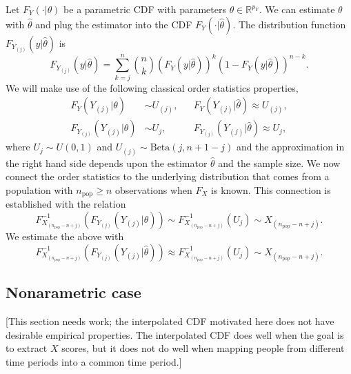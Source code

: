 \documentclass[11pt]{article}
\newcommand{\R}{\mathbb{R}}
\newcommand{\npop}{n_{\text{pop}}}
\newcommand{\nsys}{n}
\begin{document}
Let $F_Y(\cdot|\theta)$ be a parametric CDF with parameters $\theta \in \R^{p_Y}$. We can estimate $\theta$ with $\hat{\theta}$ and plug the estimator into the CDF $F_Y(\cdot|\hat{\theta})$. The distribution function $F_{Y_{(j)}}(y|\hat{\theta})$ is
$$
  F_{Y_{(j)}}(y|\hat{\theta}) = \sum_{k=j}^{\nsys}
    {\nsys \choose k}\left(F_Y(y|\hat{\theta})\right)^k
      \left(1 - F_Y(y|\hat{\theta})\right)^{\nsys - k}.
$$
We will make use of the following classical order statistics properties,
\begin{align*}
  F_Y(Y_{(j)}|\theta) &\sim U_{(j)},  &&F_Y(Y_{(j)}|\hat{\theta}) \approx U_{(j)}, \\
  F_{Y_{(j)}}(Y_{(j)}|\theta) &\sim U_j,  &&  F_{Y_{(j)}}(Y_{(j)}|\hat{\theta}) \approx U_j, 
\end{align*}
where $U_j \sim U(0,1)$ and $U_{(j)} \sim \text{Beta}(j, \nsys + 1 - j)$ and the approximation in the right hand side depends upon the estimator $\hat{\theta}$ and the sample size. We now connect the order statistics to the underlying distribution that comes from a population with $\npop \geq \nsys$ observations when $F_X$ is known. This connection is established with the relation
$$
  F^{-1}_{X_{(\npop - \nsys + j)}}\left(F_{Y_{(j)}}(Y_{(j)}|\theta)\right) 
    \sim F^{-1}_{X_{(\npop - \nsys + j)}}\left(U_j\right) 
    \sim X_{(\npop - \nsys + j)}.
$$
We estimate the above with 
$$
  F^{-1}_{X_{(\npop - \nsys + j)}}\left(F_{Y_{(j)}}(Y_{(j)}|\hat{\theta})\right) 
    \approx F^{-1}_{X_{(\npop - \nsys + j)}}\left(U_j\right) 
    \sim X_{(\npop - \nsys + j)}.
$$



\subsection{Nonarametric case}

[This section needs work; the interpolated CDF motivated here does not have desirable empirical properties. The interpolated CDF does well when the goal is to extract $X$ scores, but it does not do well when mapping people from different time periods into a common time period.] \vspace{0.5cm}
\end{document}
